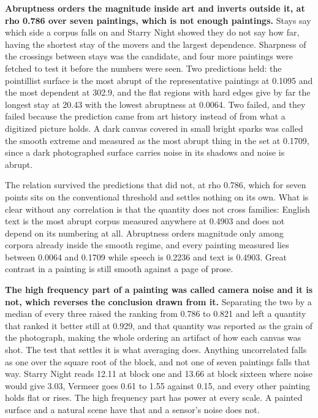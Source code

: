 \textbf{Abruptness orders the magnitude inside art and inverts outside it, at rho 0.786 over seven paintings, which is not enough paintings.} Stays say which side a corpus falls on and Starry Night showed they do not say how far, having the shortest stay of the movers and the largest dependence. Sharpness of the crossings between stays was the candidate, and four more paintings were fetched to test it before the numbers were seen. Two predictions held: the pointillist surface is the most abrupt of the representative paintings at 0.1095 and the most dependent at 302.9, and the flat regions with hard edges give by far the longest stay at 20.43 with the lowest abruptness at 0.0064. Two failed, and they failed because the prediction came from art history instead of from what a digitized picture holds. A dark canvas covered in small bright sparks was called the smooth extreme and measured as the most abrupt thing in the set at 0.1709, since a dark photographed surface carries noise in its shadows and noise is abrupt.

The relation survived the predictions that did not, at rho 0.786, which for seven points sits on the conventional threshold and settles nothing on its own. What is clear without any correlation is that the quantity does not cross families: English text is the most abrupt corpus measured anywhere at 0.4903 and does not depend on its numbering at all. Abruptness orders magnitude only among corpora already inside the smooth regime, and every painting measured lies between 0.0064 and 0.1709 while speech is 0.2236 and text is 0.4903. Great contrast in a painting is still smooth against a page of prose.

\textbf{The high frequency part of a painting was called camera noise and it is not, which reverses the conclusion drawn from it.} Separating the two by a median of every three raised the ranking from 0.786 to 0.821 and left a quantity that ranked it better still at 0.929, and that quantity was reported as the grain of the photograph, making the whole ordering an artifact of how each canvas was shot. The test that settles it is what averaging does. Anything uncorrelated falls as one over the square root of the block, and not one of seven paintings falls that way. Starry Night reads 12.11 at block one and 13.66 at block sixteen where noise would give 3.03, Vermeer goes 0.61 to 1.55 against 0.15, and every other painting holds flat or rises. The high frequency part has power at every scale. A painted surface and a natural scene have that and a sensor's noise does not.

